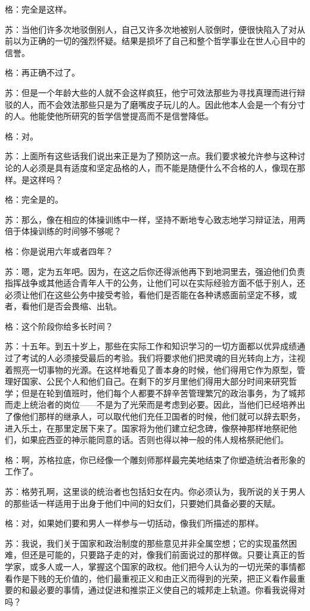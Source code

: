 \documentclass[12pt,oneside]{book}
\begin{document}
格：完全是这样。

苏：当他们许多次地驳倒别人，自己又许多次地被别人驳倒时，便很快陷入了对从前以为正确的一切的强烈怀疑。结果是损坏了自己和整个哲学事业在世人心目中的信誉。

格：再正确不过了。

苏：但是一个年龄大些的人就不会这样疯狂，他宁可效法那些为寻找真理而进行辩驳的人，而不会效法那些只是为了磨嘴皮子玩儿的人。因此他本人会是一个有分寸的人。他能使他所研究的哲学信誉提高而不是信誉降低。

格：对。

苏：上面所有这些话我们说出来正是为了预防这一点。我们要求被允许参与这种讨论的人必须是具有适度和坚定品格的人，而不能是随便什么不合格的人，像现在那样。是这样吗？

格：完全是的。

苏：那么，像在相应的体操训练中一样，坚持不断地专心致志地学习辩证法，用两倍于体操训练的时间够不够呢？

格：你是说用六年或者四年？

苏：嗯，定为五年吧。因为，在这之后你还得派他再下到地洞里去，强迫他们负责指挥战争或其他适合青年人干的公务，让他们可以在实际经验方面不低于别人，还必须让他们在这些公务中接受考验，看他们是否能在各种诱惑面前坚定不移，或者，看他们是否会畏缩、出轨。

格：这个阶段你给多长时间？

苏：十五年。到五十岁上，那些在实际工作和知识学习的一切方面都以优异成绩通过了考试的人必须接受最后的考验。我们将要求他们把灵魂的目光转向上方，注视着照亮一切事物的光源。在这样地看见了善本身的时候，他们得用它作为原型，管理好国家、公民个人和他们自己。在剩下的岁月里他们得用大部分时间来研究哲学；但是在轮到值班时，他们每个人都要不辞辛苦管理繁冗的政治事务，为了城邦而走上统治者的岗位——不是为了光荣而是考虑到必要。因此，当他们已经培养出了像他们那样的继承人，可以取代他们充任卫国者的时候，他们就可以辞去职务，进入乐土，在那里定居下来了。国家将为他们建立纪念碑，像祭神那样地祭祀他们，如果庇西亚的神示能同意的话。否则也得以神一般的伟人规格祭祀他们。

格：啊，苏格拉底，你已经像一个雕刻师那样最完美地结束了你塑造统治者形象的工作了。

苏：格劳孔啊，这里谈的统治者也包括妇女在内。你必须认为，我所说的关于男人的那些话一样适用于出身于他们中间的妇女们，只要她们具备必要的天赋。

格：对，如果她们要和男人一样参与一切括动，像我们所描述的那样。

苏：我说，我们关于国家和政治制度的那些意见并非全属空想；它的实现虽然困难，但还是可能的，只要路子走的对，像我们前面说过的那样做。只要让真正的哲学家，或多人或一人，掌握这个国家的政权。他们把今人认为的一切光荣的事情都看作是下贱的无价值的，他们最重视正义和由正义而得到的光荣，把正义看作最重要的和最必要的事情，通过促进和推崇正义使自己的城邦走上轨道。你看我说得对吗？
\end{document}
